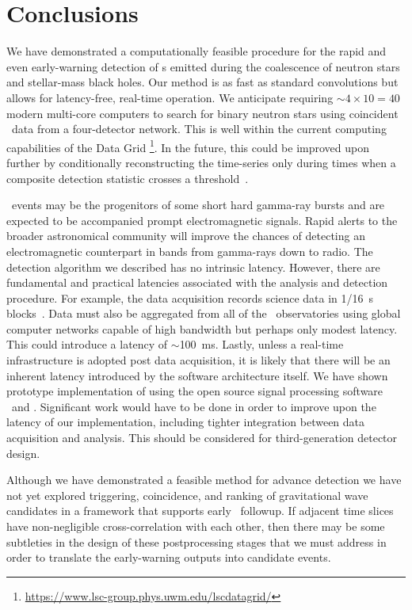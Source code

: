 \section{Conclusions}
\label{sec:conclusions}

We have demonstrated a computationally feasible procedure for the rapid and
even early-warning detection of \GW{}s emitted during the coalescence
of neutron stars and stellar-mass black holes. Our method is as fast as
standard \fft{} convolutions but allows for latency-free, real-time
operation.  We anticipate requiring $\sim 4 \times 10 = 40$ modern multi-core computers to
search for binary neutron stars using coincident \GW\ data from a four-detector network.
This is well within the current computing capabilities of the \LIGO{} Data Grid%
\footnote{\url{https://www.lsc-group.phys.uwm.edu/lscdatagrid/}}. In the future, this
could be improved upon further by conditionally reconstructing the \SNR{} time-series
only during times when a composite detection statistic crosses a
threshold~\citep{svd-compdetstat}.

\CBC\ events may be the progenitors of some short hard gamma-ray bursts and are
expected to be accompanied prompt electromagnetic signals.  Rapid
alerts to the broader astronomical community will improve the chances of
detecting an electromagnetic counterpart in bands from gamma-rays down to
radio.  The detection algorithm we described has no intrinsic latency.  However, there are
fundamental and practical latencies associated with the analysis and detection
procedure. For example, the \LIGO{} data acquisition records science data in 1/16~s
blocks~\citep{Bork2001}. Data must also be aggregated from all of the \GW\
observatories using global computer networks capable of high bandwidth but perhaps only
modest latency.  This could introduce a latency of $\sim$100~ms.  Lastly, unless a
real-time infrastructure is adopted post data acquisition, it is likely that there will be 
an inherent latency introduced by the software architecture itself.  We have shown 
prototype implementation of \lloid{} using the open source signal processing software
\gstreamer\ and \gstlal. Significant work would have to be done in order to
improve upon the latency of our implementation, including tighter integration between
data acquisition and analysis. This should be considered for third-generation detector
design.

Although we have demonstrated a feasible method for advance detection we have
not yet explored triggering, coincidence, and ranking of gravitational wave
candidates in a framework that supports early \EM\ followup.  If adjacent time slices
have non-negligible cross-correlation with each other, then there may be some
subtleties in the design of these postprocessing stages that we must address in order
to translate the early-warning outputs into candidate events.


